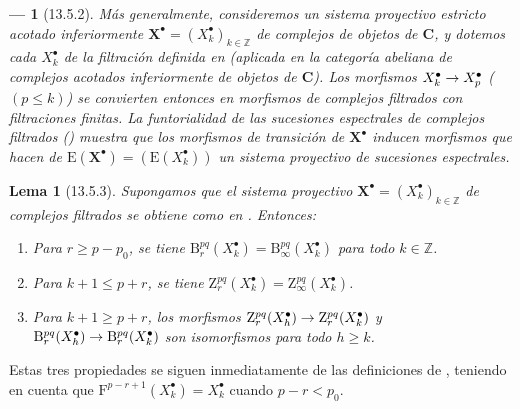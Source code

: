 \documentclass[10pt,oneside,openany]{book}
\theoremstyle{egaenv}\newtheorem*{env}{---}
\theoremstyle{egastatement}
\newtheorem*{lemma}{Lema}
\theoremstyle{egadescription}
\newcommand{\oldpage}[2][]{\marginnote{\normalfont\scriptsize\textbf{#1}\,|\,#2}\ignorespaces}
\renewcommand{\leq}{\leqslant}
\renewcommand{\geq}{\geqslant}
\renewcommand{\to}{\mathchoice{\longrightarrow}{\rightarrow}{\rightarrow}{\rightarrow}}
\begin{document}
\begin{env}[13.5.2]
\label{0.13.5.2}
\label{0.13.5.2-fr}
Más generalmente, consideremos un sistema proyectivo estricto acotado
inferiormente
$\mathbf X^\bullet=(X_k^\bullet)_{k\in\mathbb Z}$ de complejos de objetos de
$\boldsymbol{C}$, y dotemos cada $X_k^\bullet$ de la filtración definida en
 (aplicada en la categoría abeliana de complejos acotados
inferiormente de objetos de $\boldsymbol{C}$).
Los morfismos
$X_k^\bullet\to X_p^\bullet$ ($(p\leq k)$) se convierten entonces
en morfismos de complejos \emph{filtrados} con filtraciones finitas.
La funtorialidad de las sucesiones espectrales de complejos filtrados
() muestra que los morfismos de transición de
$\mathbf X^\bullet$ inducen morfismos que hacen de
$\mathrm E(\mathbf X^\bullet)=(\mathrm E(X_k^\bullet))$
un \emph{sistema proyectivo de sucesiones espectrales}.
\end{env}

\begin{lemma}[13.5.3]
\label{0.13.5.3}
\label{0.13.5.3-fr}
Supongamos que el sistema proyectivo
$\mathbf X^\bullet=(X_k^\bullet)_{k\in\mathbb Z}$ de complejos filtrados se
obtiene como en . Entonces:
\begin{enumerate}
  \item[{\rm a)}] Para $r\geq p-p_0$, se tiene
  $\mathrm B_r^{pq}(X_k^\bullet)=\mathrm B_\infty^{pq}(X_k^\bullet)$
  para todo $k\in\mathbb Z$.
  \item[{\rm b)}] Para $k+1\leq p+r$, se tiene
  $\mathrm Z_r^{pq}(X_k^\bullet)=\mathrm Z_\infty^{pq}(X_k^\bullet)$.
  \item[{\rm c)}] Para $k+1\geq p+r$, los morfismos $\mathrm Z_r^{pq}(X_h^\bullet)\to\mathrm Z_r^{pq}(X_k^\bullet)$ y $\mathrm B_r^{pq}(X_h^\bullet)\to\mathrm B_r^{pq}(X_k^\bullet)$ son isomorfismos para todo $h\geq k$.
\end{enumerate}
\end{lemma}

\oldpage[0\textsubscript{III}]{72}
Estas tres propiedades se siguen inmediatamente de las definiciones de
, teniendo en cuenta que
$\mathrm F^{p-r+1}(X_k^\bullet)=X_k^\bullet$ cuando $p-r<p_0$.
\end{document}

